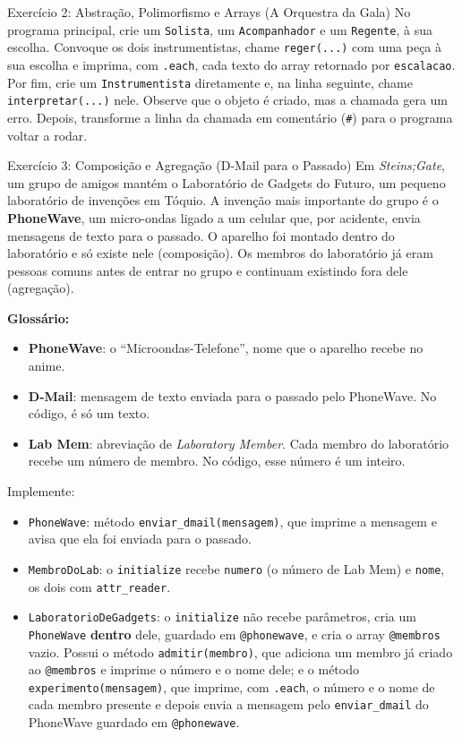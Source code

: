 \begin{exercicio}{Exercício 2: Abstração, Polimorfismo e Arrays (A Orquestra da Gala)}
No programa principal, crie um \texttt{Solista}, um \texttt{Acompanhador} e um
\texttt{Regente}, à sua escolha. Convoque os dois instrumentistas, chame \texttt{reger(...)}
com uma peça à sua escolha e imprima, com \texttt{.each}, cada texto do array retornado por
\texttt{escalacao}. Por fim, crie um \texttt{Instrumentista} diretamente e, na linha seguinte,
chame \texttt{interpretar(...)} nele. Observe que o objeto é criado, mas a chamada gera um erro.
Depois, transforme a linha da chamada em comentário (\texttt{\#}) para o programa voltar a
rodar.
\end{exercicio}

\begin{exercicio}{Exercício 3: Composição e Agregação (D-Mail para o Passado)}
Em \textit{Steins;Gate}, um grupo de amigos mantém o Laboratório de Gadgets do Futuro, um
pequeno laboratório de invenções em Tóquio. A invenção mais importante do grupo é o
\textbf{PhoneWave}, um micro-ondas ligado a um celular que, por acidente, envia mensagens de
texto para o passado. O aparelho foi montado dentro do laboratório e só existe nele
(composição). Os membros do laboratório já eram pessoas comuns antes de entrar no grupo e
continuam existindo fora dele (agregação).

\textbf{Glossário:}
\begin{itemize}
    \item \textbf{PhoneWave}: o ``Microondas-Telefone'', nome que o aparelho recebe no anime.
    \item \textbf{D-Mail}: mensagem de texto enviada para o passado pelo PhoneWave. No código, é
    só um texto.
    \item \textbf{Lab Mem}: abreviação de \textit{Laboratory Member}. Cada membro do laboratório
    recebe um número de membro. No código, esse número é um inteiro.
\end{itemize}

Implemente:

\begin{itemize}
    \item \texttt{PhoneWave}: método \texttt{enviar\_dmail(mensagem)}, que imprime a mensagem e
    avisa que ela foi enviada para o passado.

    \item \texttt{MembroDoLab}: o \texttt{initialize} recebe \texttt{numero} (o número de Lab
    Mem) e \texttt{nome}, os dois com \texttt{attr\_reader}.

    \item \texttt{LaboratorioDeGadgets}: o \texttt{initialize} não recebe parâmetros, cria um
    \texttt{PhoneWave} \textbf{dentro} dele, guardado em \texttt{@phonewave}, e cria o array
    \texttt{@membros} vazio. Possui o método \texttt{admitir(membro)}, que adiciona um membro já
    criado ao \texttt{@membros} e imprime o número e o nome dele; e o método
    \texttt{experimento(mensagem)}, que imprime, com \texttt{.each}, o número e o nome de cada
    membro presente e depois envia a mensagem pelo \texttt{enviar\_dmail} do PhoneWave guardado
    em \texttt{@phonewave}.
\end{itemize}


\end{exercicio}
